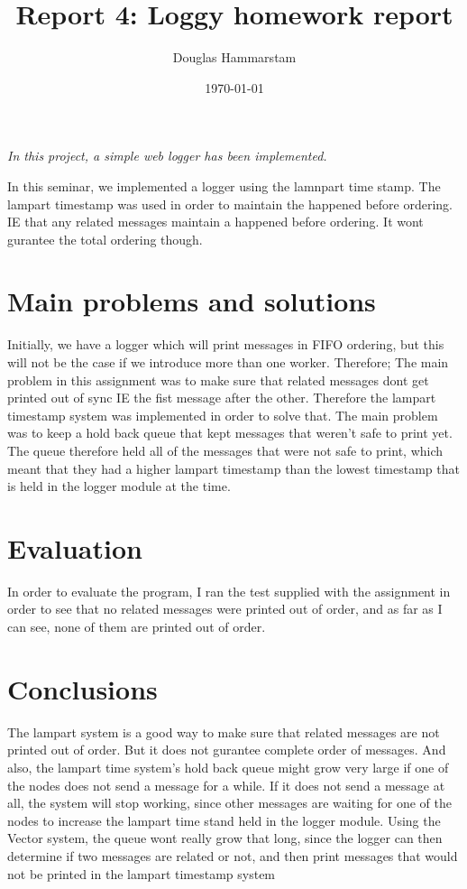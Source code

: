 \documentclass[a4paper, 11pt]{article}
\title{Report 4: Loggy homework report}
\author{Douglas Hammarstam}
\date{\today{}}
\begin{document}
\maketitle

\textit{In this project, a simple web logger has been implemented.}

In this seminar, we implemented a logger using the lamnpart time stamp.
The lampart timestamp was used in order to maintain the happened before ordering. IE that any related messages maintain a happened before ordering. It wont gurantee the total ordering though.
\section{Main problems and solutions}
Initially, we have a logger which will print messages in FIFO ordering, but this will not be the case if we introduce more than one worker. Therefore;
The main problem in this assignment was to make sure that related messages dont get printed out of sync IE the fist message after the other.
Therefore the lampart timestamp system was implemented in order to solve that.
The main problem was to keep a hold back queue that kept messages that weren't safe to print yet. 
The queue therefore held all of the messages that were not safe to print, which meant that they had a higher lampart timestamp than the lowest timestamp that is held in the logger module at the time.

\section{Evaluation}

In order to evaluate the program, I ran the test supplied with the assignment in order to see that no related messages were printed out of order, and as far as I can see, none of them are printed out of order.

\section{Conclusions}

The lampart system is a good way to make sure that related messages are not printed out of order. But it does not gurantee complete order of messages. And also, the lampart time system's hold back queue might grow very large if one of the nodes does not send a message for a while. If it does not send a message at all, the system will stop working, since other messages are waiting for one of the nodes to increase the lampart time stand held in the logger module.
Using the Vector system, the queue wont really grow that long, since the logger can then determine if two messages are related or not, and then print messages that would not be printed in the lampart timestamp system
\end{document}
